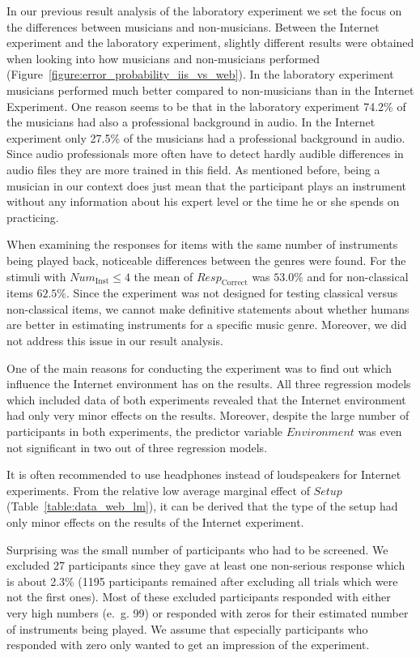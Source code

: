 In our previous result analysis of the laboratory experiment\cite{Stoter2013} we set the focus on the differences between musicians and non-musicians. Between the Internet experiment and the laboratory experiment, slightly different results were obtained when looking into how musicians and non-musicians performed (Figure~\ref{figure:error_probability_iis_vs_web}). In the laboratory experiment musicians performed much better compared to non-musicians than in the Internet Experiment. One reason seems to be that in the laboratory experiment 74.2\% of the musicians had also a professional background in audio. In the Internet experiment only 27.5\% of the musicians had a professional background in audio. Since audio professionals more often have to detect hardly audible differences in audio files they are more trained in this field. As mentioned before, being a musician in our context does just mean that the participant plays an instrument without any information about his expert level or the time he or she spends on practicing.

When examining the responses for items with the same number of instruments being played back, noticeable differences between the genres were found. For the stimuli with $\textit{Num}_{\mathrm{Inst}} \le 4$ the mean of $\textit{Resp}_{\mathrm{Correct}}$ was $53.0\%$ and for non-classical items $62.5\%$. Since the experiment was not designed for testing classical versus non-classical items, we cannot make definitive statements about whether humans are better in estimating instruments for a specific music genre. Moreover, we did not address this issue in our result analysis.

One of the main reasons for conducting the experiment was to find out which influence the Internet environment has on the results. All three regression models which included data of both experiments revealed that the Internet environment had only very minor effects on the results. Moreover, despite the large number of participants in both experiments, the predictor variable $\textit{Environment}$ was even not significant in two out of three regression models.

It is often recommended to use headphones instead of loudspeakers for Internet experiments. From the relative low average marginal effect of $\textit{Setup}$ (Table~\ref{table:data_web_lm}), it can be derived that the type of the setup had only minor effects on the results of the Internet experiment.

Surprising was the small number of participants who had to be screened. We excluded 27 participants since they gave at least one non-serious response which is about 2.3\% (1195 participants remained after excluding all trials which were not the first ones). Most of these excluded participants responded with either very high numbers (e.~g. 99) or responded with zeros for their estimated number of instruments being played. We assume that especially participants who responded with zero only wanted to get an impression of the experiment.

